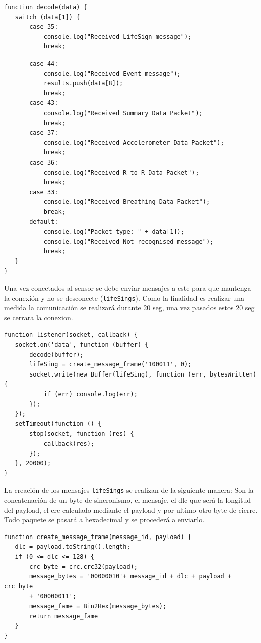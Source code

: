 \begin{verbatim}
function decode(data) {
   switch (data[1]) {
       case 35:
           console.log("Received LifeSign message");
           break;
           \end{verbatim}
           \pagebreak
           \begin{verbatim}
       case 44:
           console.log("Received Event message");
           results.push(data[8]);
           break;
       case 43:
           console.log("Received Summary Data Packet");
           break;
       case 37:
           console.log("Received Accelerometer Data Packet");
           break;
       case 36:
           console.log("Received R to R Data Packet");
           break;
       case 33:
           console.log("Received Breathing Data Packet");
           break;
       default:
           console.log("Packet type: " + data[1]);
           console.log("Received Not recognised message");
           break;
   }
}
\end{verbatim}

Una vez conectados al sensor se debe enviar mensajes a este para que mantenga la conexión y no se desconecte (\texttt{lifeSings}). Como la finalidad es realizar una medida la comunicación se realizará durante 20 seg, una vez pasados estos 20 seg se cerrara la conexion. 

\begin{verbatim}
function listener(socket, callback) {
   socket.on('data', function (buffer) {
       decode(buffer);
       lifeSing = create_message_frame('100011', 0);
       socket.write(new Buffer(lifeSing), function (err, bytesWritten) {
           if (err) console.log(err);
       });
   });
   setTimeout(function () {
       stop(socket, function (res) {
           callback(res);
       });
   }, 20000);
}
\end{verbatim}

La creación de los mensajes \texttt{lifeSings} se realizan de la siguiente manera: Son la concatenación de un byte de sincronismo, el mensaje, el dlc que será la longitud del payload, el crc calculado mediante el payload y por ultimo otro byte de cierre. Todo paquete se pasará a hexadecimal y se procederá a enviarlo.
 \pagebreak
\begin{verbatim}
function create_message_frame(message_id, payload) {
   dlc = payload.toString().length;
   if (0 <= dlc <= 128) {
       crc_byte = crc.crc32(payload);
       message_bytes = '00000010'+ message_id + dlc + payload + crc_byte 
       + '00000011';
       message_fame = Bin2Hex(message_bytes);
       return message_fame
   }
}
\end{verbatim}


